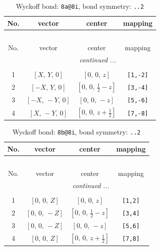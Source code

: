 \documentclass[fleqn,8pt]{jsarticle}
\begin{document}
\begin{longtable}{cccc}
\caption{Wyckoff bond: {\tt 8a@8i}, bond symmetry: {\tt ..2}}
 \\
 \hline \hline
No. & vector & center & mapping \\ \hline \endfirsthead

\multicolumn{3}{l}{\tablename\ \thetable{}} \\
 \hline \hline
No. & vector & center & mapping \\ \hline \endhead

 \hline \hline
\multicolumn{3}{r}{\footnotesize\it continued ...} \\ \endfoot

 \hline \hline
\multicolumn{3}{r}{} \\ \endlastfoot

1 & $\left[ X,\, Y,\, 0 \right]$ & $\left[ 0,\, 0,\, z \right]$ & {\tt [1,-2]} \\ \hline
2 & $\left[ - X,\, Y,\, 0 \right]$ & $\left[ 0,\, 0,\, \frac{1}{2} - z \right]$ & {\tt [3,-4]} \\ \hline
3 & $\left[ - X,\, - Y,\, 0 \right]$ & $\left[ 0,\, 0,\, - z \right]$ & {\tt [5,-6]} \\ \hline
4 & $\left[ X,\, - Y,\, 0 \right]$ & $\left[ 0,\, 0,\, z + \frac{1}{2} \right]$ & {\tt [7,-8]} \\
\end{longtable}
\renewcommand{\arraystretch}{1.2}
\begin{longtable}{cccc}
\caption{Wyckoff bond: {\tt 8b@8i}, bond symmetry: {\tt ..2}}
 \\
 \hline \hline
No. & vector & center & mapping \\ \hline \endfirsthead

\multicolumn{3}{l}{\tablename\ \thetable{}} \\
 \hline \hline
No. & vector & center & mapping \\ \hline \endhead

 \hline \hline
\multicolumn{3}{r}{\footnotesize\it continued ...} \\ \endfoot

 \hline \hline
\multicolumn{3}{r}{} \\ \endlastfoot

1 & $\left[ 0,\, 0,\, Z \right]$ & $\left[ 0,\, 0,\, z \right]$ & {\tt [1,2]} \\ \hline
2 & $\left[ 0,\, 0,\, - Z \right]$ & $\left[ 0,\, 0,\, \frac{1}{2} - z \right]$ & {\tt [3,4]} \\ \hline
3 & $\left[ 0,\, 0,\, - Z \right]$ & $\left[ 0,\, 0,\, - z \right]$ & {\tt [5,6]} \\ \hline
4 & $\left[ 0,\, 0,\, Z \right]$ & $\left[ 0,\, 0,\, z + \frac{1}{2} \right]$ & {\tt [7,8]} \\
\end{longtable}
\end{document}
